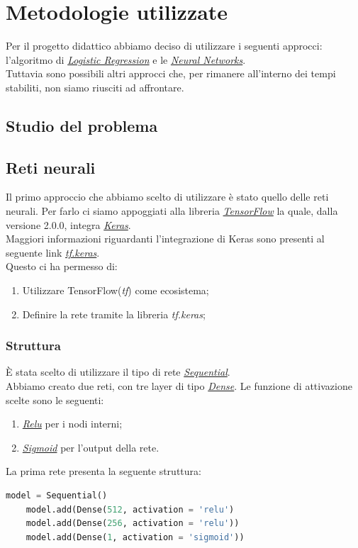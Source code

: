 \section{Metodologie utilizzate}
Per il progetto didattico abbiamo deciso di utilizzare i seguenti approcci: l'algoritmo di \href{https://en.wikipedia.org/wiki/Logistic_regression}{\textit{Logistic Regression}} e le \href{https://en.wikipedia.org/wiki/Neural_network}{\textit{Neural Networks}}.\\
Tuttavia sono possibili altri approcci che, per rimanere all'interno dei tempi stabiliti, non siamo riusciti ad affrontare. 

\subsection{Studio del problema}
\subsection{Reti neurali}
Il primo approccio che abbiamo scelto di utilizzare è stato quello delle reti neurali.
Per farlo ci siamo appoggiati alla libreria \href{https://www.tensorflow.org/}{\textit{TensorFlow}} la quale, dalla versione 2.0.0, integra \href{https://keras.io/}{\textit{Keras}}.\\
Maggiori informazioni riguardanti l'integrazione di Keras sono presenti al seguente link \href{https://www.tensorflow.org/guide/keras}{\textit{tf.keras}}.\\ 
Questo ci ha permesso di:
\begin{enumerate}
\item Utilizzare TensorFlow(\textit{tf}) come ecosistema;
\item Definire la rete tramite la libreria \textit{tf.keras};
\end{enumerate} 
\subsubsection{Struttura}
È stata scelto di utilizzare il tipo di rete \href{https://keras.io/getting-started/sequential-model-guide/}{\textit{Sequential}}.\\ 
Abbiamo creato due reti, con tre layer di tipo \href{https://keras.io/layers/core/}{\textit{Dense}}.
Le funzione di attivazione scelte sono le seguenti:
\begin{enumerate}
\item \href{https://keras.io/activations/#relu}{\textit{Relu}} per i nodi interni;
\item \href{https://keras.io/activations/#sigmoid}{\textit{Sigmoid}} per l'output della rete.
\end{enumerate}
La prima rete presenta la seguente struttura:
\begin{lstlisting}[language=Python]
	model = Sequential()  
	model.add(Dense(512, activation = 'relu')
	model.add(Dense(256, activation = 'relu'))
	model.add(Dense(1, activation = 'sigmoid'))
\end{lstlisting}


